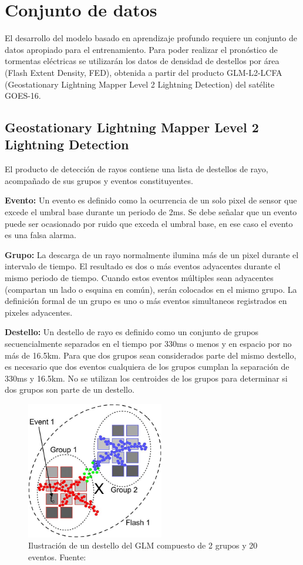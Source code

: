 \section{Conjunto de datos}

El desarrollo del modelo basado en aprendizaje profundo requiere un conjunto de 
datos apropiado para el entrenamiento. Para poder realizar el pronóstico de 
tormentas eléctricas se utilizarán los datos de densidad de destellos por área 
(Flash Extent Density, FED), obtenida a partir del producto GLM-L2-LCFA 
(Geostationary Lightning Mapper Level 2 Lightning Detection) del satélite 
GOES-16.

\subsection{Geostationary Lightning Mapper Level 2 Lightning Detection}
El producto de detección de rayos contiene una lista de destellos de rayo, 
acompañado de sus grupos y eventos constituyentes.

\textbf{Evento: }Un evento es definido como la ocurrencia de un solo pixel de sensor que excede 
el umbral base durante un periodo de 2ms. Se debe señalar que un evento puede 
ser ocasionado por ruido que exceda el umbral base, en ese caso el evento es 
una falsa alarma.

\textbf{Grupo: }La descarga de un rayo normalmente ilumina más de un pixel durante el intervalo 
de tiempo. El resultado es dos o más eventos adyacentes durante el mismo 
periodo de tiempo. Cuando estos eventos múltiples sean adyacentes (compartan 
un lado o esquina en común), serán colocados en el mismo grupo. La definición 
formal de un grupo es uno o más eventos simultaneos registrados en pixeles 
adyacentes.

\textbf{Destello: }Un destello de rayo es definido como un conjunto de grupos 
secuencialmente separados en el tiempo por 330ms o menos y en espacio por no 
más de 16.5km. Para que dos grupos sean considerados parte del mismo destello, 
es necesario que dos eventos cualquiera de los grupos cumplan la separación de 
330ms y 16.5km. No se utilizan los centroides de los grupos para determinar 
si dos grupos son parte de un destello.

\begin{figure}[H]
  \centering
  \includegraphics[width=6cm]{E_IMAGENES/5_Metodologia/flash_group_event}
  \caption[Destello del GLM]{
    Ilustración de un destello del GLM compuesto de 2 grupos y 20 eventos.
    \newline
    Fuente: \citep{GOODMAN201334}
  }
  \label{fig:fed}
\end{figure}


